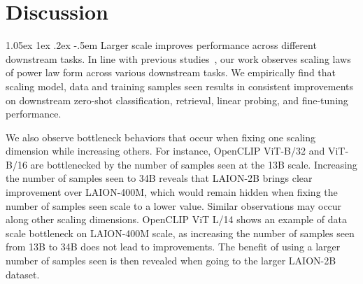 \documentclass[11pt,table]{article}
\makeatletter
\newcommand{\citep}{\cite}
\renewcommand\paragraph{\@startsection{paragraph}{4}{\z@}                                     {1.05ex \@plus1ex \@minus.2ex}                                {-.5em}
{\normalfont\normalsize\bfseries}}
\makeatother
\begin{document}










\section{Discussion}
\label{sec:discussion_and_conclusion}

\paragraph{Larger scale improves performance across different downstream tasks.} In line with previous studies~\citep{Kaplan2020,tay2021scale,Riquelme2021,Zhai2022scaling}, our work observes scaling laws of power law form across various downstream tasks. We empirically find that scaling model, data and training samples seen results in consistent improvements on downstream zero-shot classification, retrieval, linear probing, and fine-tuning performance.

We also observe bottleneck behaviors \citep{Kaplan2020,Zhai2022scaling} that occur when fixing one scaling dimension while increasing others. For instance, OpenCLIP ViT-B/32 and ViT-B/16 are bottlenecked by the number of samples seen at the 13B scale. Increasing the number of samples seen to 34B reveals that LAION-2B brings clear improvement over LAION-400M, which would remain hidden when fixing the number of samples seen scale to a lower value. Similar observations may occur along other scaling dimensions. OpenCLIP ViT L/14 shows an example of data scale bottleneck on LAION-400M scale, as increasing the number of samples seen from 13B to 34B does not lead to improvements. The benefit of using a larger number of samples seen is then revealed when going to the larger LAION-2B dataset. 
\end{document}

